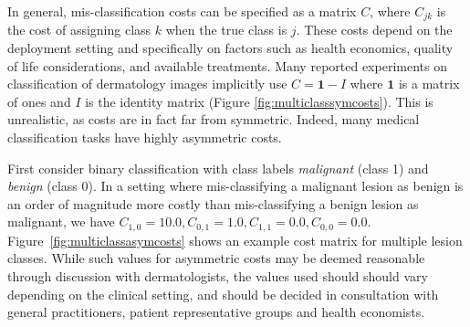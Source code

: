 In general, mis-classification costs can be specified as a matrix $C$, where $C_{jk}$ is the cost of assigning class $k$ when the true class is $j$. These costs depend on the deployment setting and specifically on factors such as health economics, quality of life considerations, and available treatments. Many reported experiments on classification of dermatology images implicitly use $C = \mathbf{1} - I$ where $\mathbf{1}$ is a matrix of ones and $I$ is the identity matrix (Figure \ref{fig:multiclasssymcosts}). This is unrealistic, as costs are in fact far from symmetric. Indeed, many medical classification tasks have highly asymmetric costs.

First consider binary classification with class labels {\em malignant} (class 1) and {\em benign} (class 0). In a setting where mis-classifying a malignant lesion as benign is an order of magnitude more costly than mis-classifying a benign lesion as malignant, we have $C_{1,0} = 10.0, C_{0,1} = 1.0, C_{1,1} = 0.0, C_{0,0} = 0.0$. Figure~\ref{fig:multiclassasymcosts} shows an example cost matrix for multiple lesion classes. While such values for asymmetric costs may be deemed reasonable through discussion with dermatologists, the values used should should vary depending on the clinical setting, and should be decided in consultation with general practitioners, patient representative groups and health economists.

